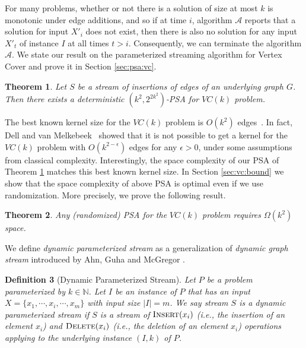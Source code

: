 \documentclass[11pt,letter]{article}
\newtheorem{theorem}{Theorem}
\newtheorem{definition}[theorem]{Definition}
\renewcommand{\paragraph}[1]{\medskip \noindent {\bf #1}}
\newcommand{\NAT}{\ensuremath{\mathbb{N}}}
\newcommand{\NATURAL}{\NAT}
\begin{document}
For many problems, whether or not there is a solution of size at most
$k$ is monotonic under edge additions, and so
if at time $i$, algorithm $\mathcal{A}$ reports that a solution
for input $X'_i$ does not exist, then
there is also no solution for any input $X'_t$ of instance $I$
at all times $t>i$.
Consequently, we can terminate the algorithm $\mathcal{A}$.
We state our result on the parameterized streaming
algorithm for Vertex Cover and prove it in Section \ref{sec:psa:vc}.


\begin{theorem}
\label{THM:VC:INSERTION}
Let $S$ be a stream of  insertions of edges of an underlying graph $G$.
Then there exists a \emph{deterministic} $(k^2,2^{2k^2})$-PSA for $VC(k)$ problem.
\end{theorem}



The best known kernel size for the $VC(k)$ problem is $O(k^2)$ edges~\cite{BG93}.
In fact, Dell and van Melkebeek~\cite{dell-lower-bound} showed that it is not possible to get
a kernel for the $VC(k)$ problem with $O(k^{2-\epsilon})$ edges for any $\epsilon>0$,
under some assumptions from classical complexity.
Interestingly, the space complexity of our PSA of Theorem \ref{THM:VC:INSERTION} matches
this best known kernel size.
In Section \ref{sec:vc:bound} we show that the space complexity of above PSA
is optimal even if we use randomization.
More precisely, we prove the following result.

\begin{theorem}
\label{thm:vc:lower:bound}
Any (randomized) PSA for the $VC(k)$ problem requires $\Omega(k^2)$ space.
\label{thm:lower-bound-vc}
\end{theorem}








\paragraph{Dynamic Streaming.}
We define \textit{dynamic parameterized stream} as a generalization of \textit{dynamic graph stream}
introduced by Ahn, Guha and McGregor \cite{AGM12a}.



\begin{definition}[Dynamic Parameterized Stream]
Let  $P$ be a problem parameterized by $k\in \NATURAL$. Let $I$ be an instance of $P$
that has an input $X=\{x_1,\cdots,x_i,\cdots, x_m\}$ with input size $|I|=m$.
We say stream $S$ is a dynamic parameterized stream if $S$
is  a stream of $\textsc{Insert}(x_i)$ (i.e., the insertion
of an element $x_i$) and $\textsc{Delete}(x_i)$ (i.e., the deletion of
an element $x_i$) operations applying to the underlying instance
$(I,k)$ of $P$.
\end{definition}
\end{document}
